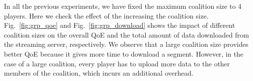 In all the previous experiments, we have fixed the maximum coalition size to 4 players. Here we check the effect of the increasing the coalition size. Fig.~\ref{fig:grp_qoe} and Fig.~\ref{fig:grp_download} shows the impact of different coalition sizes on the overall QoE and the total amount of data downloaded from the streaming server, respectively. We observe that a large coalition size provides better QoE because it gives more time to download a segment. However, in the case of a large coalition, every player has to upload more data to the other members of the coalition, which incurs an additional overhead.
